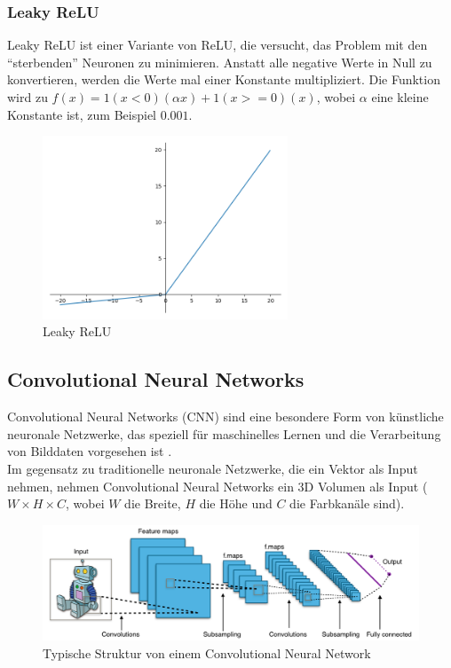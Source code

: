 \subsubsection{Leaky ReLU}
Leaky ReLU ist einer Variante von ReLU, die versucht, das Problem mit den ``sterbenden'' Neuronen zu minimieren. Anstatt alle negative Werte
in Null zu konvertieren, werden die Werte mal einer Konstante multipliziert. Die Funktion wird zu $ f(x) = 1(x < 0)(\alpha x) + 1(x >= 0)(x)$,
wobei $ \alpha $ eine kleine Konstante ist, zum Beispiel $ 0.001 $.

\begin{figure}[H]
  \centering
  \includegraphics[width=0.65\textwidth]{resources/nn/leaky-relu.png}
  \caption{
    Leaky ReLU 
    \cite{leaky-relu}
  }
  \label{image:leaky-relu}
\end{figure}

\subsection{Convolutional Neural Networks}
Convolutional Neural Networks (\gls{CNN}) sind eine besondere Form von künstliche neuronale Netzwerke, das speziell für maschinelles Lernen
und die Verarbeitung von Bilddaten vorgesehen ist \cite{convnet-erklaerung}.
\\
Im gegensatz zu traditionelle neuronale Netzwerke, die ein Vektor als Input nehmen, nehmen Convolutional Neural Networks ein 3D Volumen als Input
($ W \times H \times C $, wobei $W$ die Breite, $H$ die Höhe und $C$ die Farbkanäle sind).

\begin{figure}[H]
  \centering
  \includegraphics[width=1\textwidth]{resources/cnn/typical_cnn.png}
  \caption{
    Typische Struktur von einem Convolutional Neural Network
    \cite{convnet}
  }
  \label{image:convnet}
\end{figure}


